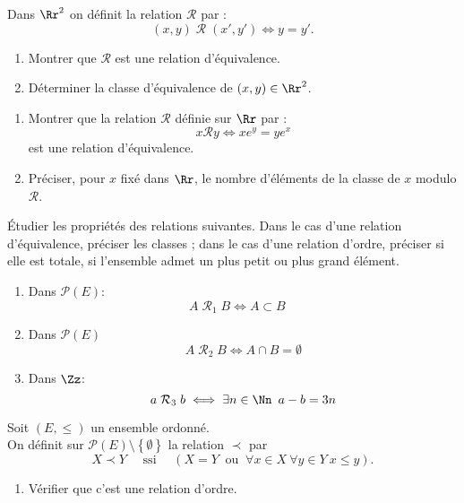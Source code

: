 \documentclass[10pt, a4paper, twocolumn]{homework}
\begin{document}
Dans $\Rr^2$ on d\'efinit la relation $\mathcal{R}$ par :
$$(x,y)\;\mathcal{R}\;(x',y')\iff y=y'.$$
\begin{enumerate}
    \item Montrer que $\mathcal{R}$ est une relation d'\'equivalence.
    \item D\'eterminer la classe d'\'equivalence de $(x,y)\in \Rr^2$.
\end{enumerate}
\begin{enumerate}
  \item
Montrer que la relation $\mathcal{R}$ d\'{e}finie sur $\Rr$ par :
$$x\mathcal{R} y\Longleftrightarrow xe^{y}=ye^{x}$$
est une relation d'\'{e}quivalence.
\item
Pr\'{e}ciser, pour $x$ fix\'{e} dans $\Rr$, le nombre d'\'{e}l\'{e}ments de
la classe de $x$ modulo $\mathcal{R}$.
\end{enumerate}
\'Etudier les propri\'et\'es des relations suivantes. Dans le cas
d'une relation d'\'equivalence, pr\'eciser les classes ; dans le cas
d'une relation d'ordre, pr\'eciser si elle est totale, si l'ensemble admet
un plus petit ou plus grand \'el\'ement.
\begin{enumerate}
    \item Dans $\mathcal{P}(E)$:
      $$A\;\mathcal{R}_1\; B \iff A\subset B\quad$$

    \item Dans $\mathcal{P}(E)$ $$A\;\mathcal{R}_2\; B \iff A\cap
      B=\emptyset$$
    \item Dans $\Zz$:
$$ a\;\mathcal{R}_3\; b \iff \exists n\in \Nn \ \,a-b=3n$$
\end{enumerate}
Soit $ (E, \leq)$ un ensemble ordonn\'e.\\
On d\'efinit sur $\mathcal{P} (E)\setminus\left\{ \emptyset \right\}$ la relation
$\prec$ par 
$$X \prec Y \quad \text{ ssi } \quad (X = Y \ \text{ ou } \ 
\forall x \in X \  \forall y \in Y \  x \leq y).$$ 
\begin{enumerate}
  \item  V\'erifier que c'est une relation d'ordre.
\end{enumerate}

\end{document}

